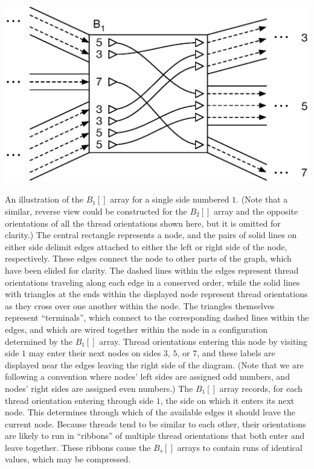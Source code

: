 \begin{FPfigure}
\centering
\includegraphics[width=\linewidth]{figures/03_gpbwt/barray.eps}
\caption[An illustration of the {$B_{1}[]$} array]{An illustration of the $B_{1}[]$ array for a single side numbered $1$. (Note that a similar, reverse view could be constructed for the $B_2[]$ array and the opposite orientations of all the thread orientations shown here, but it is omitted for clarity.) The central rectangle represents a node, and the pairs of solid lines on either side delimit edges attached to either the left or right side of the node, respectively. These edges connect the node to other parts of the graph, which have been elided for clarity. The dashed lines within the edges represent thread orientations traveling along each edge in a conserved order, while the solid lines with triangles at the ends within the displayed node represent thread orientations as they cross over one another within the node. The triangles themselves represent ``terminals'', which connect to the corresponding dashed lines within the edges, and which are wired together within the node in a configuration determined by the $B_{1}[]$ array. Thread orientations entering this node by visiting side $1$ may enter their next nodes on sides $3$, $5$, or $7$, and these labels are displayed near the edges leaving the right side of the diagram. (Note that we are following a convention where nodes' left sides are assigned odd numbers, and nodes' right sides are assigned even numbers.) The $B_1[]$ array records, for each thread orientation entering through side $1$, the side on which it enters its next node. This determines through which of the available edges it should leave the current node. Because threads tend to be similar to each other, their orientations are likely to run in ``ribbons'' of multiple thread orientations that both enter and leave together. These ribbons cause the $B_s[]$ arrays to contain runs of identical values, which may be compressed.}
\label{fig:barray}
\end{FPfigure}

